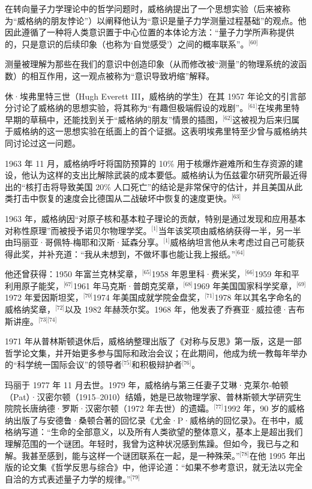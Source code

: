 在转向量子力学理论中的哲学问题时，威格纳提出了一个思想实验（后来被称为“威格纳的朋友悖论”）以阐释他认为“意识是量子力学测量过程基础”的观点。他因此遵循了一种将人类意识置于中心位置的本体论方法：“量子力学所声称提供的，只是意识的后续印象（也称为‘自觉感受’）之间的概率联系”。\(^\text{[60]}\)

测量被理解为那些在我们的意识中创造印象（从而修改被“测量”的物理系统的波函数）的相互作用，这一观点被称为“意识导致坍缩”解释。

休·埃弗里特三世（Hugh Everett III，威格纳的学生）在其 1957 年论文的引言部分讨论了威格纳的思想实验，将其称为“有趣但极端假设的戏剧”。\(^\text{[61]}\)在埃弗里特早期的草稿中，还能找到关于“威格纳的朋友”情景的插图，\(^\text{[62]}\)这被视为后来归属于威格纳的这一思想实验在纸面上的首个证据。这表明埃弗里特至少曾与威格纳共同讨论过这一问题。

1963 年 11 月，威格纳呼吁将国防预算的 10\% 用于核爆炸避难所和生存资源的建设，他认为这样的支出比解除武装的成本要低。威格纳认为伍兹霍尔研究所最近得出的“核打击将导致美国 20\% 人口死亡”的结论是非常保守的估计，并且美国从此类打击中恢复的速度会比德国从二战破坏中恢复的速度更快。\(^\text{[63]}\)

1963 年，威格纳因“对原子核和基本粒子理论的贡献，特别是通过发现和应用基本对称性原理”而被授予诺贝尔物理学奖。\(^\text{[1]}\)当年该奖项由威格纳获得一半，另一半由玛丽亚·哥佩特-梅耶和汉斯·延森分享。\(^\text{[1]}\)威格纳坦言他从未考虑过自己可能获得此奖，并补充道：“我从未想到，不做坏事也能让我上报纸。”\(^\text{[64]}\)

他还曾获得：1950 年富兰克林奖章，\(^\text{[65]}\)1958 年恩里科·费米奖，\(^\text{[66]}\)1959 年和平利用原子能奖，\(^\text{[67]}\)1961 年马克斯·普朗克奖章，\(^\text{[68]}\)1969 年美国国家科学奖章，\(^\text{[69]}\)1972 年爱因斯坦奖，\(^\text{[70]}\)1974 年美国成就学院金盘奖，\(^\text{[71]}\)1978 年以其名字命名的威格纳奖章，\(^\text{[72]}\)以及 1982 年赫茨尔奖。1968 年，他发表了乔赛亚·威拉德·吉布斯讲座。\(^\text{[73][74]}\)

1971 年从普林斯顿退休后，威格纳整理出版了《对称与反思》第一版，这是一部哲学论文集，并开始更多参与国际和政治会议；在此期间，他成为统一教每年举办的“科学统一国际会议”的领导者\(^\text{[75]}\)和积极辩护者\(^\text{[76]}\)。

玛丽于 1977 年 11 月去世。1979 年，威格纳与第三任妻子艾琳·克莱尔-帕顿（Pat）·汉密尔顿（1915–2010）结婚，她是已故物理学家、普林斯顿大学研究生院院长唐纳德·罗斯·汉密尔顿（1972 年去世）的遗孀。\(^\text{[77]}\)1992 年，90 岁的威格纳出版了与安德鲁·桑顿合著的回忆录《尤金·P·威格纳的回忆录》。在书中，威格纳写道：“生命的全部意义，以及所有人类欲望的整体意义，基本上是超出我们理解范围的一个谜团。年轻时，我曾为这种状况感到焦躁。但如今，我已与之和解。我甚至感到，能与这样一个谜团联系在一起，是一种殊荣。”\(^\text{[78]}\)在他 1995 年出版的论文集《哲学反思与综合》中，他评论道：“如果不参考意识，就无法以完全自洽的方式表述量子力学的规律。”\(^\text{[79]}\)

